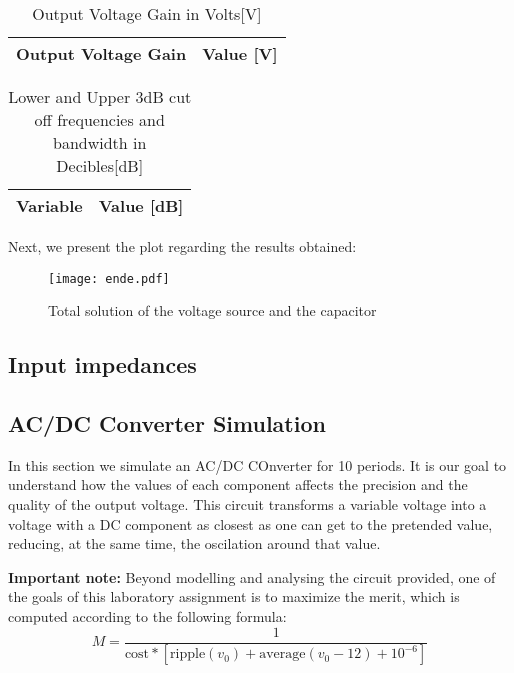 \begin{table}[H]
  \centering
  \begin{tabular}{|l|r|}
    \hline    
    {\bf Output Voltage Gain} & {\bf Value [V]} \\ \hline
    
  \end{tabular}
  \caption{Output Voltage Gain in Volts[V]}
  \label{tab:gain}
\end{table}

\begin{table}[H]
  \centering
  \begin{tabular}{|l|r|}
    \hline    
    {\bf Variable} & {\bf Value [dB]} \\ \hline
    
  \end{tabular}
  \caption{Lower and Upper 3dB cut off frequencies and bandwidth in Decibles[dB]}
  \label{tab:freq}
\end{table}

Next, we present the plot regarding the results obtained:

\begin{figure}[H] \centering
\texttt{[image: ende.pdf]}
\caption{Total solution of the voltage source and the capacitor}
\label{fig:env+vore}
\end{figure}

\newpage
\subsection{Input impedances}









\subsection{AC/DC Converter Simulation}
\label{subsec:circuit_simulation}
\par In this section we simulate an AC/DC COnverter for 10 periods. It is our goal to understand how the values of each component affects the precision and the quality of the output voltage. This circuit transforms a variable voltage into a voltage with a DC component as closest as one can get to the pretended value, reducing, at the same time, the oscilation around that value.

\par  \textbf{Important note:} Beyond modelling and analysing the circuit provided, one of the goals of this laboratory assignment is to maximize the merit, which is computed according to the following formula:
\begin{equation}
M = \frac{1}{\text{cost}*[\text{ripple}(v_0)+\text{average}(v_{0}-12)+10^{-6}]}
\end{equation}

